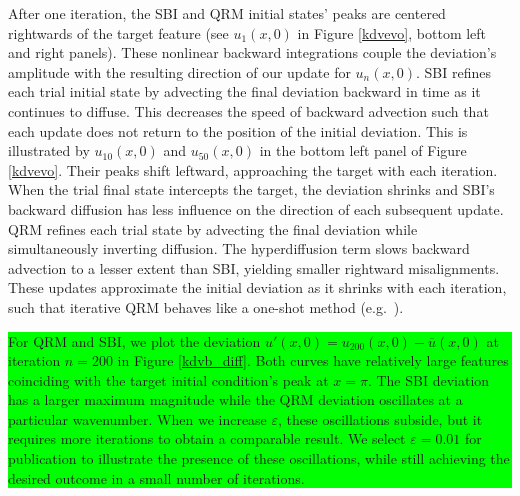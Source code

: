 \documentclass[%
 reprint,
 amsmath,amssymb,
 aps,
 pre,
]{revtex4-2}
\newcommand{\hly}[1]{\colorbox{lime}{\parbox{\columnwidth}{#1}}}
\begin{document}
After one iteration, the SBI and QRM initial states' peaks are centered rightwards of the target feature (see $u_1(x,0)$ in Figure \ref{kdvevo}, bottom left and right panels). 
These nonlinear backward integrations couple the deviation's amplitude with the resulting direction of our update for $u_n(x,0)$.
SBI refines each trial initial state by advecting the final deviation backward in time as it continues to diffuse. 
This decreases the speed of backward advection such that each update does not return to the position of the initial deviation.
This is illustrated by $u_{10}(x,0)$ and $u_{50}(x,0)$ in the bottom left panel of Figure \ref{kdvevo}.
Their peaks shift leftward, approaching the target with each iteration.
When the trial final state intercepts the target, the deviation shrinks and SBI's backward diffusion has less influence on the direction of each subsequent update.
QRM refines each trial state by advecting the final deviation while simultaneously inverting diffusion.
The hyperdiffusion term slows backward advection to a lesser extent than SBI, yielding smaller rightward misalignments. 
These updates approximate the initial deviation as it shrinks with each iteration, such that iterative QRM behaves like a one-shot method (e.g.~\cite{Nabi2022}).

\hspace{-0.45cm}\hly{For QRM and SBI, we plot the deviation $u'(x,0) = u_{200}(x,0) - \overline{u}(x,0)$ at iteration $n=200$ in Figure \ref{kdvb_diff}.
Both curves have relatively large features coinciding with the target initial condition's peak at $x=\pi$.
The SBI deviation has a larger maximum magnitude while the QRM deviation oscillates at a particular wavenumber.
When we increase $\varepsilon$, these oscillations subside, but it requires more iterations to obtain a comparable result.
We select $\varepsilon = 0.01$ for publication to illustrate the presence of these oscillations, while still achieving the desired outcome in a small number of iterations.
}
\end{document}
